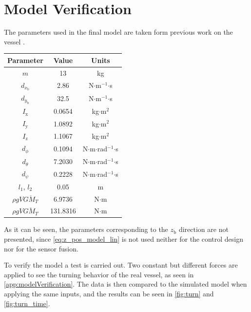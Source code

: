 \newpage
\section{Model Verification}\label{sec:modelVerification}
The parameters used in the final model are taken form previous work on the vessel \cite{thesis}.

\begin{table}[H]
    \begin{tabular}{|c|c|c|}    
        \hline %
        \textbf{Parameter} &\textbf{Value} & \textbf{Units} \\
        \hline %
        $m$  & 13 & kg \\
        $d_{\dot{x}_\mathrm{b}}$  & 2.86 & N$\cdot$m$^{-1}$$\cdot$s \\
        $d_{\dot{y}_\mathrm{b}}$  & 32.5 & N$\cdot$m$^{-1}$$\cdot$s \\
        $I_\mathrm{x}$  & 0.0654 & kg$\cdot$m$^2$ \\
        $I_\mathrm{y}$  & 1.0892 & kg$\cdot$m$^2$ \\
        $I_\mathrm{z}$  & 1.1067 & kg$\cdot$m$^2$ \\
        $d_{\dot{\phi}}$ & 0.1094 &  N$\cdot$m$\cdot$rad$^{-1}$$\cdot$s\\
        $d_{\dot{\theta}}$ & 7.2030 & N$\cdot$m$\cdot$rad$^{-1}$$\cdot$s \\
        $d_{\dot{\psi}}$ & 0.2228 & N$\cdot$m$\cdot$rad$^{-1}$$\cdot$s \\
        $l_1$, $l_2$  & 0.05 & m \\
        $\rho g V \overline{GM_{T}}$ & 6.9736 & N$\cdot$m\\
        $\rho g V \overline{GM_{T}}$ & 131.8316 & N$\cdot$m\\
        \hline %
    \end{tabular}
\end{table}

As it can be seen, the parameters corresponding to the $z_\mathrm{b}$ direction are not presented, since \autoref{eq:z_pos_model_lin} is not used neither for the control design nor for the sensor fusion.

To verify the model a test is carried out. Two constant but different forces are applied to see the turning behavior of the real vessel, as seen in \autoref{app:modelVerification}. The data is then compared to the simulated model when applying the same inputs, and the results can be seen in \autoref{fig:turn} and \ref{fig:turn_time}.

